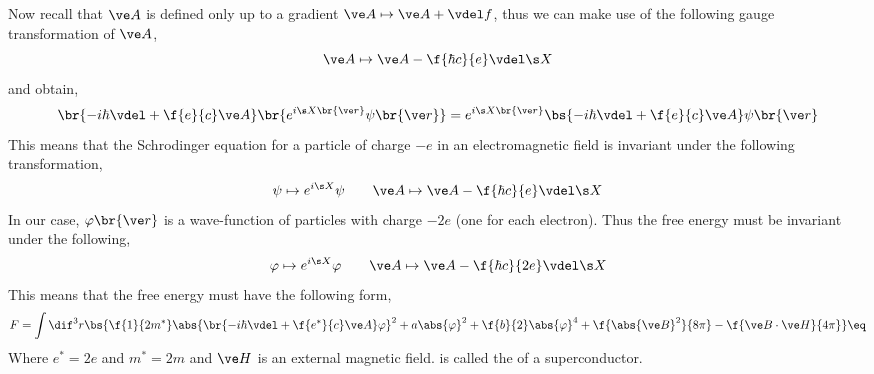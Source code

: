 \documentclass{article}
\newcommand{\vp}{\varphi}
\begin{document}
Now recall that $\ve A$ is defined only up to a gradient $\ve A \mapsto \ve A + \vdel f$, thus we can make use of the following gauge transformation of $\ve A$,
\[ \ve A \mapsto \ve A - \f{\hbar c}{e} \vdel \s X \]
and obtain,
\[ \br{- i \hbar \vdel  + \f{e}{c} \ve A} \br{e^{i \s X \br{\ve r}}\psi\br{\ve r}} = e^{i \s X \br{\ve r}} \bs{- i \hbar \vdel  + \f{e}{c} \ve A} \psi\br{\ve r} \]
This means that the Schrodinger equation for a particle of charge $-e$ in an electromagnetic field is invariant under the following transformation,
\[ \psi \mapsto e^{i \s X} \psi \qquad \ve A \mapsto \ve A - \f{\hbar c}{e} \vdel \s X \]
In our case, $\vp\br{\ve r}$ is a wave-function of particles with charge $-2e$ (one for each electron). Thus the free energy must be invariant under the following,
\[ \vp \mapsto e^{i \s X} \vp \qquad \ve A \mapsto \ve A - \f{\hbar c}{2e} \vdel \s X \]
This means that the free energy must have the following form,
\[ F = \int \dif^3 r \bs{\f{1}{2 m^*} \abs{\br{-i \hbar \vdel  + \f{e^{*}}{c} \ve A}\vp}^2 + a \abs{\vp}^2 + \f{b}{2}\abs{\vp}^4 + \f{\abs{\ve B}^2}{8\pi} - \f{\ve B \cdot \ve H}{4\pi}} \eq \label{eq:ginzburg-landau}\]
Where $e^* = 2e$ and $m^* = 2m$ and $\ve H$ is an external magnetic field.  is called the  of a superconductor. \\
\end{document}
